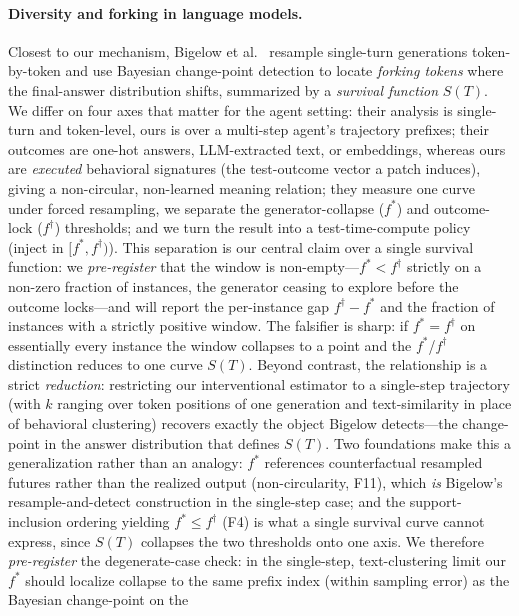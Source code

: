 \documentclass[11pt]{article}
\begin{document}
\paragraph{Diversity and forking in language models.}
Closest to our mechanism, Bigelow et al.~\citep{bigelow2024forking} resample
single-turn generations token-by-token and use Bayesian change-point detection to locate
\emph{forking tokens} where the final-answer distribution shifts, summarized by a
\emph{survival function} $S(T)$. We differ on four axes that matter for the agent
setting: their analysis is single-turn and token-level, ours is over a multi-step
agent's trajectory prefixes; their outcomes are one-hot answers, LLM-extracted text,
or embeddings, whereas ours are \emph{executed} behavioral signatures (the
test-outcome vector a patch induces), giving a non-circular, non-learned meaning
relation; they measure one curve under forced resampling, we separate the
generator-collapse ($f^\ast$) and outcome-lock ($f^\dagger$) thresholds; and we turn
the result into a test-time-compute policy (inject in $[f^\ast,f^\dagger)$). This
separation is our central claim over a single survival function: we
\emph{pre-register} that the window is non-empty---$f^\ast<f^\dagger$ strictly on a
non-zero fraction of instances, the generator ceasing to explore before the outcome
locks---and will report the per-instance gap $f^\dagger-f^\ast$ and the fraction of
instances with a strictly positive window. The falsifier is sharp: if
$f^\ast=f^\dagger$ on essentially every instance the window collapses to a point and
the $f^\ast$/$f^\dagger$ distinction reduces to one curve $S(T)$. Beyond contrast,
the relationship is a strict \emph{reduction}: restricting our interventional
estimator to a single-step trajectory (with $k$ ranging over token positions of one
generation and text-similarity in place of behavioral clustering) recovers exactly
the object Bigelow detects---the change-point in the answer distribution that defines
$S(T)$. Two foundations make this a generalization rather than an analogy: $f^\ast$
references counterfactual resampled futures rather than the realized output
(non-circularity, F11), which \emph{is} Bigelow's resample-and-detect construction in
the single-step case; and the support-inclusion ordering yielding $f^\ast\le
f^\dagger$ (F4) is what a single survival curve cannot express, since $S(T)$ collapses
the two thresholds onto one axis. We therefore \emph{pre-register} the degenerate-case
check: in the single-step, text-clustering limit our $f^\ast$ should localize collapse
to the same prefix index (within sampling error) as the Bayesian change-point on the
\end{document}
